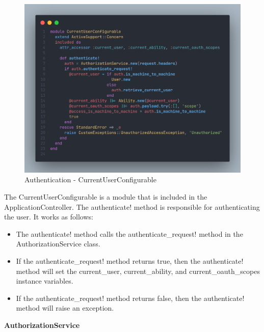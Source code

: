 \begin{justify}
        \begin{figure}[H]
            \centerline{\includegraphics[width=150mm,scale=1]{figures/implementation_and_testing/implementation/backend/CurrentUserConfigurable.png}}
            \caption{Authentication - CurrentUserConfigurable}
        \end{figure}

        \newendline The CurrentUserConfigurable is a module that is included in the ApplicationController. The authenticate! method is responsible for authenticating the user. It works as follows:

            \begin{itemize}
                \item The authenticate! method calls the authenticate\_request! method in the AuthorizationService class.
                \item If the authenticate\_request! method returns true, then the authenticate! method will set the current\_user, current\_ability, and current\_oauth\_scopes instance variables.
                \item If the authenticate\_request! method returns false, then the authenticate! method will raise an exception.\\
            \end{itemize}


        \vspace{0.25cm}
        \noindent\textbf{AuthorizationService}
        

\end{justify}
